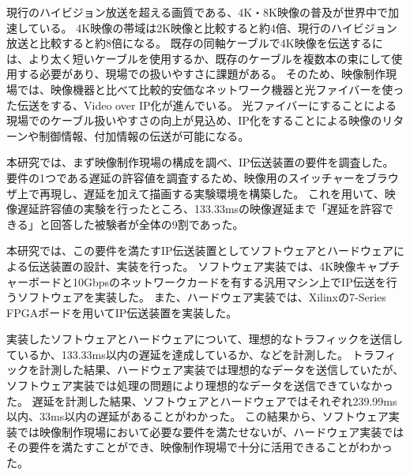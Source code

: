 
\begin{jabstract}

現行のハイビジョン放送を超える画質である、4K・8K映像の普及が世界中で加速している。
4K映像の帯域は2K映像と比較すると約4倍、現行のハイビジョン放送と比較すると約8倍になる。
既存の同軸ケーブルで4K映像を伝送するには、より太く短いケーブルを使用するか、既存のケーブルを複数本の束にして使用する必要があり、現場での扱いやすさに課題がある。
そのため、映像制作現場では、映像機器と比べて比較的安価なネットワーク機器と光ファイバーを使った伝送をする、Video over IP化が進んでいる。
光ファイバーにすることによる現場でのケーブル扱いやすさの向上が見込め、IP化をすることによる映像のリターンや制御情報、付加情報の伝送が可能になる。

本研究では、まず映像制作現場の構成を調べ、IP伝送装置の要件を調査した。
要件の1つである遅延の許容値を調査するため、映像用のスイッチャーをブラウザ上で再現し、遅延を加えて描画する実験環境を構築した。
これを用いて、映像遅延許容値の実験を行ったところ、133.33msの映像遅延まで「遅延を許容できる」と回答した被験者が全体の9割であった。

本研究では、この要件を満たすIP伝送装置としてソフトウェアとハードウェアによる伝送装置の設計、実装を行った。
ソフトウェア実装では、4K映像キャプチャーボードと10Gbpsのネットワークカードを有する汎用マシン上でIP伝送を行うソフトウェアを実装した。
また、ハードウェア実装では、Xilinxの7-Series FPGAボードを用いてIP伝送装置を実装した。

実装したソフトウェアとハードウェアについて、理想的なトラフィックを送信しているか、133.33ms以内の遅延を達成しているか、などを計測した。
トラフィックを計測した結果、ハードウェア実装では理想的なデータを送信していたが、ソフトウェア実装では処理の問題により理想的なデータを送信できていなかった。
遅延を計測した結果、ソフトウェアとハードウェアではそれぞれ239.99ms以内、33ms以内の遅延があることがわかった。
この結果から、ソフトウェア実装では映像制作現場において必要な要件を満たせないが、ハードウェア実装ではその要件を満たすことができ、映像制作現場で十分に活用できることがわかった。



\end{jabstract}
